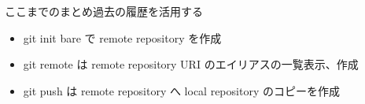 % 
% 
% 
% 

\begin{frame}[t]{ここまでのまとめ}{過去の履歴を活用する}

  \begin{itemize}
  \item git init {\dhyphen}bare で remote repository を作成
    \vspace{2ex}

  \item git remote は remote repository URI のエイリアスの一覧表示、作成
    \vspace{2ex}

  \item git push は remote repository へ local repository のコピーを作成
  \end{itemize}

\end{frame}
